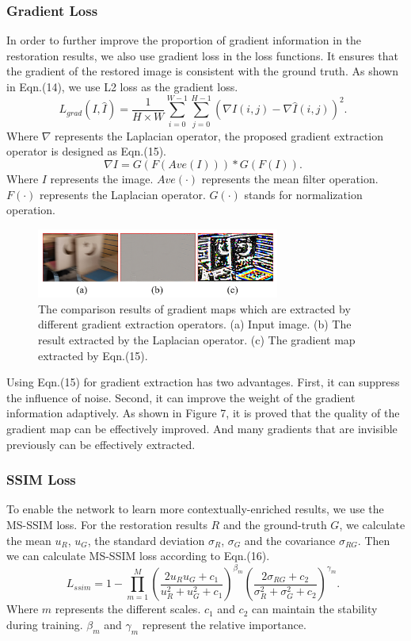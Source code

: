 \begin{sloppypar}
\subsubsection{Gradient Loss}
In order to further improve the proportion of gradient information in the restoration results, we also use gradient loss in the loss functions. It ensures that the gradient of the restored image is consistent with the ground truth. As shown in Eqn.(14), we use L2 loss as the gradient loss.
\begin{equation}
	    L_{grad}(I, \hat{I})  =  \frac{1}{H \times W} \sum_{i=0}^{W-1}\sum_{j=0}^{H-1}(\nabla I(i,j) - \nabla \hat{I}(i, j))^2. \enspace
\end{equation}
Where $\nabla$ represents the Laplacian operator, the proposed gradient extraction operator is designed as Eqn.(15).
\begin{equation}
	    \nabla I = G(F(Ave(I))) * G(F(I)). \enspace
\end{equation}
Where $I$ represents the image. $Ave(\cdot)$ represents the mean filter operation. $F(\cdot)$ represents the Laplacian operator. $G(\cdot)$ stands for normalization operation.
\begin{figure}[h]
\includegraphics[width=8cm]{images/fig8.png}
\caption{The comparison results of gradient maps which are extracted by different gradient extraction operators. (a) Input image. (b) The result extracted by the Laplacian operator. (c) The gradient map extracted by Eqn.(15).}
\label{fig_sim}
\end{figure}

Using Eqn.(15) for gradient extraction has two advantages. First, it can suppress the influence of noise. Second, it can improve the weight of the gradient information adaptively. As shown in Figure 7, it is proved that the quality of the gradient map can be effectively improved. And many gradients that are invisible previously can be effectively extracted.
\subsubsection{SSIM Loss}
To enable the network to learn more contextually-enriched results, we use the MS-SSIM loss. For the restoration results $R$ and the ground-truth $G$, we calculate the mean $u_R$, $u_G$, the standard deviation $\sigma_R$, $\sigma_G$ and the covariance $\sigma_{RG}$. Then we can calculate MS-SSIM loss according to Eqn.(16).
\begin{equation}
	    L_{ssim} = 1 - \prod^M_{m = 1}(\frac{2u_Ru_G+c_1}{u_R^2+u_G^2+c_1})^{\beta_m}(\frac{2\sigma_{RG}+c_2}{\sigma_R^2+\sigma_G^2+c_2})^{\gamma_m}. \enspace
\end{equation}
Where $m$ represents the different scales. $c_1$ and $c_2$ can maintain the stability during training. $\beta_m$ and $\gamma_m$ represent the relative importance.

\end{sloppypar}
